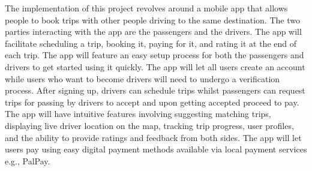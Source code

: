 \documentclass[a4paper, 12pt]{article} %
\begin{document}
            The implementation of this project revolves around a mobile app that allows people to book trips with other people driving to the same destination. The two parties interacting with the app are the passengers and the drivers. The app will facilitate scheduling a trip, booking it, paying for it, and rating it at the end of each trip. The app will feature an easy setup process for both the passengers and drivers to get started using it quickly. The app will let all users create an account while users who want to become drivers will need to undergo a verification process. After signing up, drivers can schedule trips whilst passengers can request trips for passing by drivers to accept and upon getting accepted proceed to pay. The app will have intuitive features involving suggesting matching trips, displaying live driver location on the map, tracking trip progress, user profiles, and the ability to provide ratings and feedback from both sides. The app will let users pay using easy digital payment methods available via local payment services e.g., PalPay. 
        
            
\end{document}
